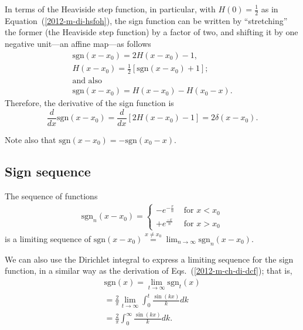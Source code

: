 In terms of  the  Heaviside step function, in particular, with
$H(0)=\frac{1}{2}$ as in Equation~(\ref{2012-m-di-hsfoh}),
the sign function can be written by ``stretching'' the former (the Heaviside step function) by a factor of two,
and shifting it by one negative unit---an affine map---as follows
\begin{equation}
\begin{split}
\textrm{sgn}(x-x_0) = 2H(x-x_0) -1,\\
H(x-x_0) = \frac{1}{2} \left[ \textrm{sgn}(x-x_0)+1\right];  \\
\textrm{and also}\\
\textrm{sgn}(x-x_0) = H(x-x_0) - H(x_0-x).
\end{split}
\label{2011-m-cbhsf}
\end{equation}
Therefore, the derivative of the sign function is
\begin{equation}
\frac{d}{dx}\textrm{sgn}(x-x_0) = \frac{d}{dx} \left[2H(x-x_0) -1\right] =2 \delta(x-x_0).
\end{equation}

Note also that  $\textrm{sgn}(x-x_0) =  - \textrm{sgn}(x_0-x)$.

\subsection{Sign sequence}


The sequence of functions
\begin{equation}
\begin{split}
\textrm{sgn}_n(x-x_0)
=
\left\{
\begin{array}{rl}
- e^{-\frac{x}{n}}&\textrm{ for } x < x_0\\
+ e^{\frac{-x}{n}}&\textrm{ for } x > x_0
\end{array}
\right.
\end{split}
\label{2012-m-ch-di-lsegn}
\end{equation}
is a limiting sequence of
$
\textrm{sgn}(x-x_0)\stackrel{x\neq x_0}{=} \lim_{n\rightarrow \infty} \textrm{sgn}_n(x-x_0)
$.


We can also use the Dirichlet integral
to express a limiting sequence for the sign function,
in a similar way as the derivation of Eqs.~(\ref{2012-m-ch-di-dcf}); that is,
\begin{equation}
\begin{split}
\textrm{sgn}(x)= \lim_{t \rightarrow \infty} \textrm{sgn}_t (x)
\\
= \frac{2}{\pi }\lim_{t \rightarrow \infty}\int_0^t \frac{\sin (kx)}{k} dk
\\
=
\frac{2}{\pi }\int_0^\infty \frac{\sin (kx)}{k} dk
.
\end{split}
\label{2015-m-ch-di-sign}
\end{equation}

